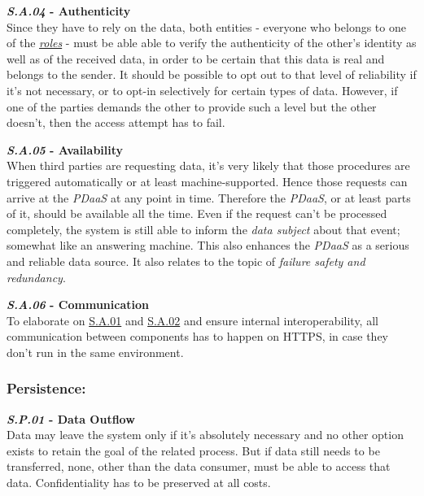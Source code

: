 \documentclass[12pt,english,a4paper,titlepage,cleardoublepage=empty,dottedtoc]{report}
\begin{document}
\textbf{\emph{\protect\hypertarget{sa04}{}{S.A.04}} - Authenticity}\\
Since they have to rely on the data, both entities - everyone who
belongs to one of the \emph{\protect\hyperlink{sa03}{roles}} - must be
able able to verify the authenticity of the other's identity as well as
of the received data, in order to be certain that this data is real and
belongs to the sender. It should be possible to opt out to that level of
reliability if it's not necessary, or to opt-in selectively for certain
types of data. However, if one of the parties demands the other to
provide such a level but the other doesn't, then the access attempt has
to fail.

\textbf{\emph{\protect\hypertarget{sa05}{}{S.A.05}} - Availability}\\
When third parties are requesting data, it's very likely that those
procedures are triggered automatically or at least machine-supported.
Hence those requests can arrive at the \emph{PDaaS} at any point in
time. Therefore the \emph{PDaaS}, or at least parts of it, should be
available all the time. Even if the request can't be processed
completely, the system is still able to inform the \emph{data subject}
about that event; somewhat like an answering machine. This also enhances
the \emph{PDaaS} as a serious and reliable data source. It also relates
to the topic of \emph{failure safety and redundancy}.

\textbf{\emph{\protect\hypertarget{sa06}{}{S.A.06}} - Communication}\\
To elaborate on \protect\hyperlink{sa01}{S.A.01} and
\protect\hyperlink{sa02}{S.A.02} and ensure internal interoperability,
all communication between components has to happen on HTTPS, in case
they don't run in the same environment.

\subsubsection*{Persistence:}\label{persistence}

\textbf{\emph{\protect\hypertarget{sp01}{}{S.P.01}} - Data Outflow}\\
Data may leave the system only if it's absolutely necessary and no other
option exists to retain the goal of the related process. But if data
still needs to be transferred, none, other than the data consumer, must
be able to access that data. Confidentiality has to be preserved at all
costs.
\end{document}

